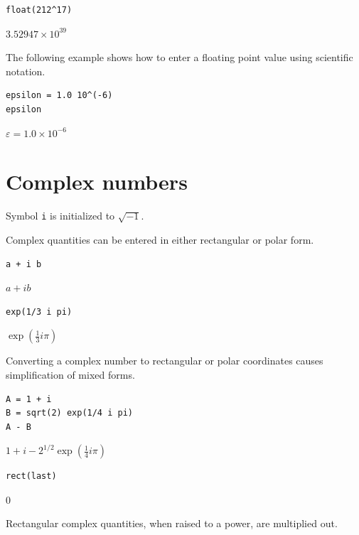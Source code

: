 \documentclass[12pt]{article}
\begin{document}
{\color{blue}
\begin{verbatim}
float(212^17)
\end{verbatim}
}

$\displaystyle 3.52947\times10^{39}$

\bigskip
The following example shows how to enter a floating point value
using scientific notation.

{\color{blue}
\begin{verbatim}
epsilon = 1.0 10^(-6)
epsilon
\end{verbatim}
}

$\displaystyle \varepsilon=1.0\times10^{-6}$

\newpage

\section{Complex numbers}

Symbol \verb$i$ is initialized to $\sqrt{-1}$.

\bigskip

Complex quantities can be entered in either rectangular or polar form.

{\color{blue}
\begin{verbatim}
a + i b
\end{verbatim}
}

$\displaystyle a+ib$

{\color{blue}
\begin{verbatim}
exp(1/3 i pi)
\end{verbatim}
}

$\displaystyle \exp\left(\tfrac{1}{3}i\pi\right)$

\bigskip

Converting a complex number to rectangular or polar coordinates causes
simplification of mixed forms.

{\color{blue}
\begin{verbatim}
A = 1 + i
B = sqrt(2) exp(1/4 i pi)
A - B
\end{verbatim}
}

$\displaystyle 1+i-2^{1/2}\exp\left(\tfrac{1}{4}i\pi\right)$

{\color{blue}
\begin{verbatim}
rect(last)
\end{verbatim}
}

$\displaystyle 0$

\bigskip

Rectangular complex quantities, when raised to a power, are multiplied out.
\end{document}
